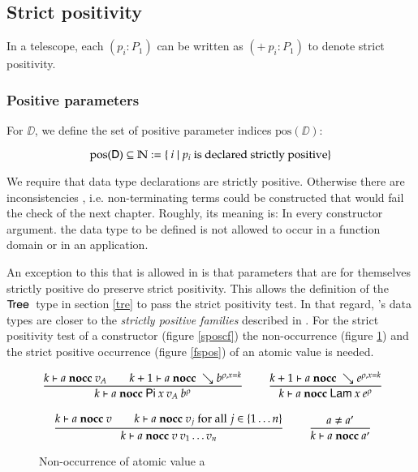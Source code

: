 \subsection{Strict positivity}

\newcommand{\pos}{\mbox{pos}}

In a telescope, each $(p_i : P_1) $ can be written as $( + \: p_i : P_1) $ to denote strict positivity.

\subsubsection{Positive parameters}
For $\DD$, we define the set of positive parameter indices $\pos(\DD)$:

\[\pos(\DD) \subseteq \cN := \{ \: i \mid p_i \mbox{ is declared strictly positive} \}\]

We require that data type declarations are strictly positive.
Otherwise there are inconsistencies \cite{paulinmohring93inductive}, i.e. non-terminating terms could be constructed that would fail the check of the next chapter.
Roughly, its meaning is: In every constructor argument. the data type to be defined is not allowed to occur in a function domain or in an application.

An exception to this that is allowed in \mugda is that parameters that are for themselves strictly positive do preserve strict positivity. 
This allows the definition of the $\mathsf{Tree}\:$ type in section \ref{tre} to pass the strict positivity test. In that regard, \mugda 's data types are closer to the \emph{strictly positive families} described in \cite{alti:cats07}.
For the strict positivity test of a constructor (figure \ref{sposcf}) the non-occurrence (figure \ref{fnocc}) and the strict positive occurrence (figure \ref{fspos}) of an atomic value is needed.

\newcommand{\sposc}[3]{#1\vdash#2\mbox{ \textbf{sposc} }#3}
\newcommand{\spos}[3]{#1\vdash#2\mbox{ \textbf{spos} }#3}


\newcommand{\nocc}[3]{#1\vdash#2\mbox{ \textbf{nocc} }#3}



\begin{figure}[htp]
\begin{gather*}
\nru{}
{\nocc{k}{a}{v_A} \qquad \nocc{k+1}{a}{\wh \cl{b}{\ins{\rho}{x}{k}}}}
{\nocc{k}{a}{\vpi \: x \: v_A \: \cl{b}{\rho}}  }
\qquad
\nru{}
{\nocc{k+1}{a}{\wh \cl{e}{\ins{\rho}{x}{k}}}}
{\nocc{k}{a}{\vlam \: x \: \cl{e}{\rho}}  }
\\[2ex]
\nru{}
{\nocc{k}{a}{v} \qquad \nocc{k}{a}{v_j} \mbox{ for all } j \in \{1 \ldots n \}}
{\nocc{k}{a}{v \: v_1 \ldots v_n}}
\qquad
\nru{}
{a \neq a'}
{\nocc{k}{a}{a'}}
\end{gather*}
\caption{Non-occurrence of atomic value a}
\label{fnocc}
\end{figure}

